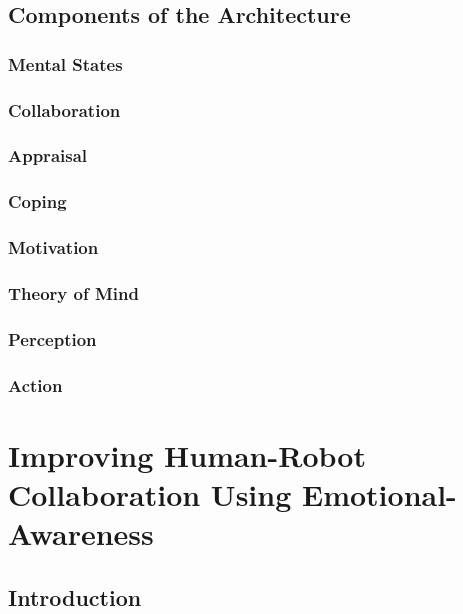 \documentclass[12pt]{report}
\begin{document}
\section{Components of the Architecture}

\subsection{Mental States}

\subsection{Collaboration}

\subsection{Appraisal}

\subsection{Coping}

\subsection{Motivation}

\subsection{Theory of Mind}

\subsection{Perception}

\subsection{Action}

\chapter{Improving Human-Robot Collaboration Using Emotional-Awareness}
\label{ch:awareness}

\section{Introduction}
\end{document}
